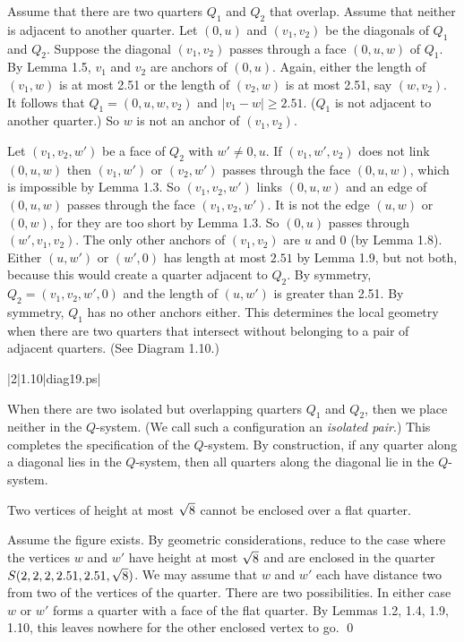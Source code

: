 Assume that there are two quarters $Q_1$ and $Q_2$ that overlap.
Assume that neither is adjacent to another quarter.  
Let $(0,u)$ and
$(v_1,v_2)$ be the diagonals of $Q_1$ and $Q_2$.
Suppose the diagonal $(v_1,v_2)$ passes through a face $(0,u,w)$ of $Q_1$.
By Lemma 1.5, $v_1$ and $v_2$ are anchors
of $(0,u)$.  Again, either the length of $(v_1,w)$ is at most
2.51 or the length of $(v_2,w)$ is at most 2.51, 
say $(w,v_2)$.
It follows that $Q_1=(0,u,w,v_2)$ and $|v_1-w|\ge2.51$.
($Q_1$ is not adjacent
to another quarter.)  So $w$ is not an anchor of $(v_1,v_2)$.

Let $(v_1,v_2,w')$ be a face of $Q_2$ with $w'\ne 0,u$.
If $(v_1,w',v_2)$ does not link $(0,u,w)$ then $(v_1,w')$ or
$(v_2,w')$ passes through the face $(0,u,w)$, which is impossible by
Lemma 1.3. 
So $(v_1,v_2,w')$  links $(0,u,w)$ and an edge of $(0,u,w)$ passes through
the face $(v_1,v_2,w')$.  
It is not the edge $(u,w)$ or $(0,w)$, for they
are too short by Lemma 1.3.  So $(0,u)$ passes through $(w',v_1,v_2)$.
The only other anchors of $(v_1,v_2)$ are $u$ and $0$ (by Lemma 1.8).
Either $(u,w')$ or $(w',0)$ has length at most $2.51$ by Lemma 1.9, but
not both,
because this would create a quarter adjacent to $Q_2$.
By symmetry,
$Q_2=(v_1,v_2,w',0)$ and the length of $(u,w')$ is greater than 2.51.
By symmetry, $Q_1$ has no other anchors either.
This determines the local geometry when there
are two quarters that intersect without belonging to a pair
of adjacent quarters.
(See Diagram 1.10.)

\smallskip
\gram|2|1.10|diag19.ps|
\smallskip


When there are two isolated but overlapping quarters $Q_1$
and $Q_2$, then we place neither in the $Q$-system.  (We call
such a configuration an {\it isolated pair}.)
This completes the specification of the $Q$-system.  By construction,
if any quarter along a diagonal lies in the $Q$-system, then
all quarters along the diagonal lie in the $Q$-system.

  Two vertices of height at most $\sqrt8$ cannot be
enclosed over a flat quarter.\endproclaim

 Assume the figure exists.  By geometric considerations,
reduce to the case where
the vertices $w$ and $w'$ have height at most $\sqrt8$ and
are enclosed in the quarter $S(2,2,2,2.51,2.51,\sqrt8)$.  
We may assume that $w$ and $w'$ each have distance
two from two of the vertices of the quarter.  There are two possibilities.
In either case $w$ or $w'$ forms a quarter with a face of the flat quarter.
By Lemmas 1.2, 1.4, 1.9, 1.10, this leaves nowhere for the other
enclosed vertex to go. \qed\enddemo

